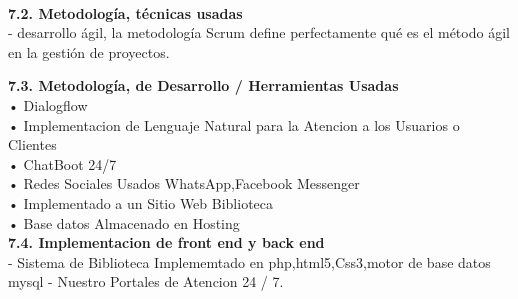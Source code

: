 \begin{flushleft}
\begin{itemize}
\textbf{ }\\
\textbf{7.2.   Metodología, técnicas usadas }\\
-	 desarrollo ágil, la metodología Scrum define perfectamente qué es el método ágil en la gestión de proyectos.

\textbf{7.3.   Metodología, de Desarrollo / Herramientas Usadas}\\
•	 Dialogflow \\
•	 Implementacion de Lenguaje Natural para la Atencion a los Usuarios o Clientes\\
•	 ChatBoot 24/7 \\
•	 Redes Sociales Usados  WhatsApp,Facebook Messenger \\
•	Implementado a un Sitio Web  Biblioteca \\
•	 Base datos Almacenado en Hosting \\


\textbf{7.4.   Implementacion de front end y back end  }\\
-	 Sistema de Biblioteca Implememtado en php,html5,Css3,motor de base datos mysql
-          Nuestro  Portales de Atencion 24 / 7.


\end{itemize}
\end{flushleft}
